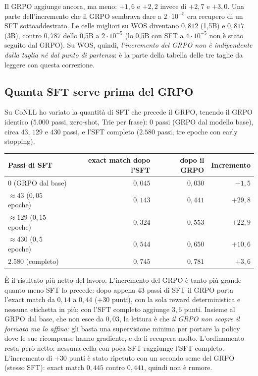 Il GRPO aggiunge ancora, ma meno: $+1{,}6$ e $+2{,}2$ invece di $+2{,}7$ e
$+3{,}0$. Una parte dell'incremento che il GRPO sembrava dare a $2\cdot
10^{-5}$ era recupero di un SFT sottoaddestrato. Le celle migliori su WOS
diventano $0{,}812$ (1,5B) e $0{,}817$ (3B), contro $0{,}787$ dello 0,5B a
$2\cdot 10^{-5}$ (lo 0,5B con SFT a $4\cdot 10^{-5}$ non è stato seguito dal
GRPO). Su WOS, quindi, \emph{l'incremento del GRPO non è indipendente dalla
taglia né dal punto di partenza}: è la parte della tabella delle tre taglie da
leggere con questa correzione.

\subsection{Quanta SFT serve prima del GRPO}
\label{sec:curva-sft}

Su CoNLL ho variato la quantità di SFT che precede il GRPO, tenendo il GRPO
identico ($5.000$ passi, zero-shot, Trie per frase): $0$ passi (GRPO dal modello
base), circa $43$, $129$ e $430$ passi, e l'SFT completo ($2.580$ passi, tre
epoche con early stopping).

\begin{center}
\small
\begin{tabular}{lrrr}
\toprule
Passi di SFT & exact match dopo l'SFT & dopo il GRPO & Incremento \\
\midrule
$0$ (GRPO dal base)             & $0{,}045$ & $0{,}030$ & $-1{,}5$ \\
$\approx 43$ ($0{,}05$ epoche)  & $0{,}143$ & $0{,}441$ & $+29{,}8$ \\
$\approx 129$ ($0{,}15$ epoche) & $0{,}324$ & $0{,}553$ & $+22{,}9$ \\
$\approx 430$ ($0{,}5$ epoche)  & $0{,}544$ & $0{,}650$ & $+10{,}6$ \\
$2.580$ (completo)              & $0{,}745$ & $0{,}781$ & $+3{,}6$ \\
\bottomrule
\end{tabular}
\end{center}

È il risultato più netto del lavoro. L'incremento del GRPO è tanto più grande
quanto meno SFT lo precede: dopo appena $43$ passi di SFT il GRPO porta
l'exact match da $0{,}14$ a $0{,}44$ ($+30$ punti), con la sola reward
deterministica e nessuna etichetta in più; con l'SFT completo aggiunge
$3{,}6$ punti. Insieme al GRPO dal base, che non esce da $0{,}03$, la lettura è
che \emph{il GRPO non scopre il formato ma lo affina}: gli basta una
supervisione minima per portare la policy dove le sue ricompense hanno
gradiente, e da lì recupera molto. L'ordinamento resta però netto: nessuna
cella con poca SFT raggiunge l'SFT completo. L'incremento di $+30$ punti è stato
ripetuto con un secondo seme del GRPO (stesso SFT): exact match $0{,}445$
contro $0{,}441$, quindi non è rumore.

